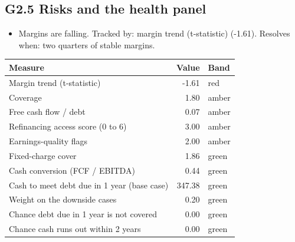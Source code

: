 \documentclass[11pt,a4paper]{article}
\begin{document}
\subsection*{G2.5 Risks and the health panel}
\begin{itemize}\item Margins are falling. Tracked by: margin trend (t-statistic) (-1.61). Resolves when: two quarters of stable margins.\end{itemize}
\begin{center}\footnotesize\setlength{\tabcolsep}{3.5pt}\begin{tabular}{@{}lrl@{}}\toprule
Measure & Value & Band \\\midrule
Margin trend (t-statistic) & -1.61 & \textcolor{bad}{red} \\
Coverage & 1.80 & \textcolor{amber}{amber} \\
Free cash flow / debt & 0.07 & \textcolor{amber}{amber} \\
Refinancing access score (0 to 6) & 3.00 & \textcolor{amber}{amber} \\
Earnings-quality flags & 2.00 & \textcolor{amber}{amber} \\
Fixed-charge cover & 1.86 & \textcolor{good}{green} \\
Cash conversion (FCF / EBITDA) & 0.44 & \textcolor{good}{green} \\
Cash to meet debt due in 1 year (base case) & 347.38 & \textcolor{good}{green} \\
Weight on the downside cases & 0.20 & \textcolor{good}{green} \\
Chance debt due in 1 year is not covered & 0.00 & \textcolor{good}{green} \\
Chance cash runs out within 2 years & 0.00 & \textcolor{good}{green} \\
\bottomrule\end{tabular}\end{center}
\end{document}
